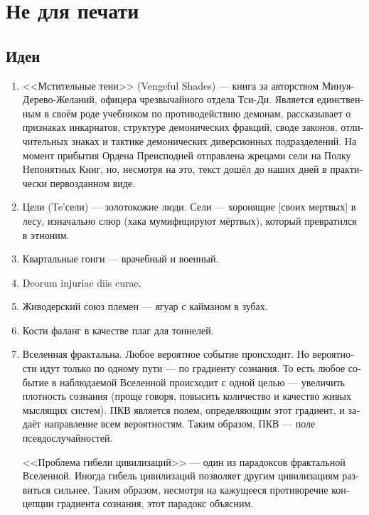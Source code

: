 \documentclass[a4paper,12pt,fleqn]{book}\usepackage{polyglossia}\setdefaultlanguage[babelshorthands=true]{russian}\setotherlanguage{english}\defaultfontfeatures{Ligatures=TeX,Mapping=tex-text}\usepackage{xcolor}\newcommand{\ml}[3]{#2}
\begin{document}
{\chapter{Не для печати}

\section{Идеи}

\begin{enumerate}

\item <<Мстительные тени>> (Vengeful Shades) --- книга за авторством Минуя-Дерево-Желаний, офицера чрезвычайного отдела Тси-Ди.
Является единственным в своём роде учебником по противодействию демонам, рассказывает о признаках инкарнатов, структуре демонических фракций, своде законов, отличительных знаках и тактике демонических диверсионных подразделений.
На момент прибытия Ордена Преисподней отправлена жрецами сели на Полку Непонятных Книг, но, несмотря на это, текст дошёл до наших дней в практически первозданном виде.

\item Цели (Te'сели) --- золотокожие люди. Сели --- хоронящие [своих мертвых] в лесу, изначально слюр (хака мумифицируют мёртвых), который превратился в этноним.

\item Квартальные гонги --- врачебный и военный.

\item Deorum injuriae diis curae.

\item Живодерский союз племен --- ягуар с кайманом в зубах.

\item Кости фаланг в качестве плаг для тоннелей.

\item Вселенная фрактальна.
Любое вероятное событие происходит.
Но вероятности идут только по одному пути --- по градиенту сознания.
То есть любое событие в наблюдаемой Вселенной происходит с одной целью --- увеличить плотность сознания (проще говоря, повысить количество и качество живых мыслящих систем).
ПКВ является полем, определяющим этот градиент, и задаёт направление всем вероятностям.
Таким образом, ПКВ --- поле псевдослучайностей.

<<Проблема гибели цивилизаций>> --- один из парадоксов фрактальной Вселенной.
Иногда гибель цивилизаций позволяет другим цивилизациям развиться сильнее.
Таким образом, несмотря на кажущееся противоречие концепции градиента сознания, этот парадокс объясним.


\end{enumerate}}
\end{document}
